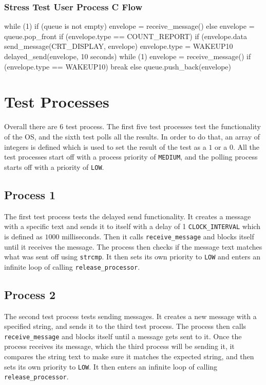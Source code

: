 \documentclass[se]{uw-wkrpt}
\begin{document}
\subsubsection{Stress Test User Process C Flow}
\begin{code}
while (1)
	if (queue is not empty)
		envelope = receive_message()
	else
		envelope = queue.pop_front
	if (envelope.type == COUNT_REPORT)
		if (envelope.data %
			send_message(CRT_DISPLAY, envelope)
			envelope.type = WAKEUP10
			delayed_send(envelope, 10 seconds)
			while (1)
				envelope = receive_message()
				if (envelope.type == WAKEUP10)
					break
				else
					queue.push_back(envelope)
\end{code}


\section{Test Processes}\label{sec:testproc}

Overall there are 6 test process. The first five test processes test the functionality of the OS, and the sixth test polls all the results. In order to do that, an array of integers is defined which is used to set the result of the test as a $1$ or a $0$. All the test processes start off with a process priority of \texttt{MEDIUM}, and the polling process starts off with a priority of \texttt{LOW}. 


\subsection{Process 1}

The first test process tests the delayed send functionality. It creates a message with a specific text and sends it to itself with a delay of 1 \texttt{CLOCK\_INTERVAL} which is defined as $1000$ milliseconds. Then it calls \texttt{receive\_message} and blocks itself until it receives the message. The process then checks if the message text matches what was sent off using \texttt{strcmp}. It then sets its own priority to \texttt{LOW} and enters an infinite loop of calling \texttt{release\_processor}. 


\subsection{Process 2}

The second test process tests sending messages. It creates a new message with a specified string, and sends it to the third test process. The process then calls \texttt{receive\_message} and blocks itself until a message gets sent to it. Once the process receives its message, which the third process will be sending it, it compares the string text to make sure it matches the expected string, and then sets its own priority to \texttt{LOW}. It then enters an infinite loop of calling \texttt{release\_processor}. 
\end{document}
